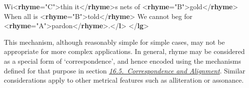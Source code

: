 \begin{shaded}
Wi{<\textbf{rhyme}\hspace*{1em}{label}="{C}">}thin it{</\textbf{rhyme}>}s nets of {<\textbf{rhyme}\hspace*{1em}{label}="{B}">}gold{</\textbf{rhyme}>}\mbox{}\newline 
{}\mbox{}\newline 
{}When all is {<\textbf{rhyme}\hspace*{1em}{label}="{B}">}told{</\textbf{rhyme}>}\mbox{}\newline 
{}\mbox{}\newline 
{}We cannot beg for {<\textbf{rhyme}\hspace*{1em}{label}="{A}">}pardon{</\textbf{rhyme}>}.{</\textbf{l}>}\mbox{}\newline 
{</\textbf{lg}>}\end{shaded}\egroup\par \noindent  \par
This mechanism, although reasonably simple for simple cases, may not be appropriate for more complex applications. In general, rhyme may be considered as a special form of ‘correspondence’, and hence encoded using the mechanisms defined for that purpose in section \textit{\hyperref[SACS]{16.5.\ Correspondence and Alignment}}. Similar considerations apply to other metrical features such as alliteration or assonance.\par
